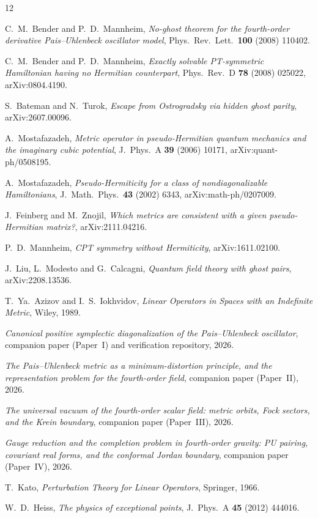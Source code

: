 \documentclass[11pt]{article}
\theoremstyle{definition}
\theoremstyle{remark}
\begin{document}
\begin{thebibliography}{12}

C.~M.~Bender and P.~D.~Mannheim,
\emph{No-ghost theorem for the fourth-order derivative Pais--Uhlenbeck
oscillator model},
Phys.\ Rev.\ Lett.\ \textbf{100} (2008) 110402.

C.~M.~Bender and P.~D.~Mannheim,
\emph{Exactly solvable PT-symmetric Hamiltonian having no Hermitian
counterpart},
Phys.\ Rev.\ D \textbf{78} (2008) 025022, arXiv:0804.4190.

S.~Bateman and N.~Turok,
\emph{Escape from Ostrogradsky via hidden ghost parity},
arXiv:2607.00096.

A.~Mostafazadeh,
\emph{Metric operator in pseudo-Hermitian quantum mechanics and the
imaginary cubic potential},
J.\ Phys.\ A \textbf{39} (2006) 10171, arXiv:quant-ph/0508195.

A.~Mostafazadeh,
\emph{Pseudo-Hermiticity for a class of nondiagonalizable
Hamiltonians},
J.\ Math.\ Phys.\ \textbf{43} (2002) 6343, arXiv:math-ph/0207009.

J.~Feinberg and M.~Znojil,
\emph{Which metrics are consistent with a given pseudo-Hermitian
matrix?},
arXiv:2111.04216.

P.~D.~Mannheim,
\emph{CPT symmetry without Hermiticity},
arXiv:1611.02100.

J.~Liu, L.~Modesto and G.~Calcagni,
\emph{Quantum field theory with ghost pairs},
arXiv:2208.13536.

T.~Ya.~Azizov and I.~S.~Iokhvidov,
\emph{Linear Operators in Spaces with an Indefinite Metric},
Wiley, 1989.

\emph{Canonical positive symplectic diagonalization of the
Pais--Uhlenbeck oscillator}, companion paper (Paper~I) and verification
repository, 2026.

\emph{The Pais--Uhlenbeck metric as a minimum-distortion principle, and
the representation problem for the fourth-order field}, companion paper
(Paper~II), 2026.

\emph{The universal vacuum of the fourth-order scalar field: metric
orbits, Fock sectors, and the Krein boundary}, companion paper
(Paper~III), 2026.

\emph{Gauge reduction and the completion problem in fourth-order
gravity: PU pairing, covariant real forms, and the conformal Jordan
boundary}, companion paper (Paper~IV), 2026.

T.~Kato,
\emph{Perturbation Theory for Linear Operators},
Springer, 1966.

W.~D.~Heiss,
\emph{The physics of exceptional points},
J.\ Phys.\ A \textbf{45} (2012) 444016.

\end{thebibliography}
\end{document}
